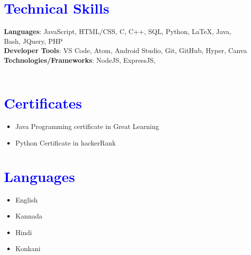 \documentclass[letterpaper,11pt]{article}
\newcommand{\resumeItem}[1]{
  \item\small{
    {#1 \vspace{-2pt}}
  }
}
\newcommand{\resumeItemListStart}{\begin{itemize}}
\newcommand{\resumeItemListEnd}{\end{itemize}\vspace{-5pt}}
\begin{document}
        \section{\textcolor{blue}{Technical Skills}}
            \vspace{2pt}
        \begin{itemize}[leftmargin=0.0in, label={}]
              \normalsize{\item{
              \textbf{Languages}{: JavaScript, HTML/CSS, C, C++, SQL, Python, LaTeX, Java, Bash, JQuery, PHP} \\
        	 \vspace{4pt}
              \textbf{Developer Tools}{: VS Code, Atom, Android Studio, Git, GitHub, Hyper, Canva} \\
        	\vspace{4pt}
              \textbf{Technologies/Frameworks}{: NodeJS, ExpressJS,} \\
            \vspace{4pt}
              \
            }}
        \section{\textcolor{blue}{Certificates}}
            \resumeItemListStart
                \resumeItem{Java Programming certificate in Great Learning}
                \resumeItem{Python Certificate in hackerRank}
              \resumeItemListEnd
        \section{\textcolor{blue}{Languages}}
            \resumeItemListStart
                \resumeItem{English}
                \resumeItem{Kannada}
                \resumeItem{Hindi}
                \resumeItem{Konkani}


              \resumeItemListEnd
        \end{itemize}
    
\end{document}
